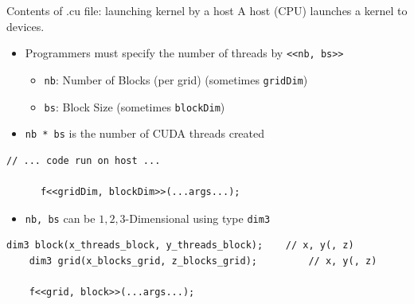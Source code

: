 \documentclass[dvipdfmx, 11pt, aspectratio=169]{beamer}   %
\begin{document}
\begin{frame}[fragile]{Contents of .cu file: launching kernel by a host}
  A host (CPU) launches a kernel to devices.
  \begin{itemize}
    \item Programmers must specify the number of threads by \lstinline|<<nb, bs>>|
    \begin{itemize}
      \item \lstinline|nb|: Number of Blocks (per grid) (sometimes \lstinline|gridDim|)
      \item \lstinline|bs|: Block Size (sometimes \lstinline|blockDim|)
    \end{itemize}
    \item \lstinline|nb * bs| is the number of CUDA threads created
  \end{itemize}\vspace{-1.5\baselineskip}
  \begin{block}{}
    \begin{lstlisting}[language=CUDA]
      // ... code run on host ...
      
      f<<gridDim, blockDim>>(...args...);
\end{lstlisting}
  \end{block}\vspace{-\baselineskip}
  \begin{itemize}
    \item \lstinline|nb, bs| can be ${1,2,3}$-Dimensional using type \lstinline|dim3|
  \end{itemize}\vspace{-1.5\baselineskip}
  \begin{block}{}
    \begin{lstlisting}[language=CUDA]
    dim3 block(x_threads_block, y_threads_block);    // x, y(, z)
    dim3 grid(x_blocks_grid, z_blocks_grid);         // x, y(, z)
          
    f<<grid, block>>(...args...);
\end{lstlisting}
  \end{block}
\end{frame}
\end{document}
